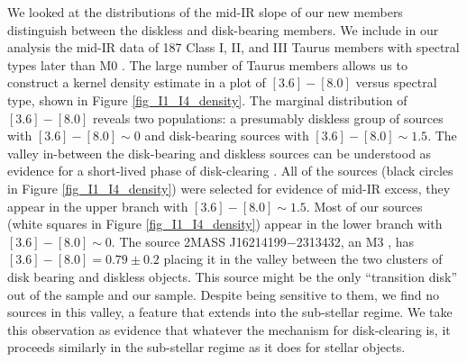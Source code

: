 We looked at the distributions of the mid-IR slope of our new members distinguish between the diskless and disk-bearing members.  We include in our analysis the mid-IR data of 187 Class I, II, and III Taurus members with spectral types later than M0 \citep{2010ApJS..186..111L}.  The large number of Taurus members allows us to construct a kernel density estimate in a plot of $[3.6]-[8.0]$ versus spectral type, shown in Figure \ref{fig_I1_I4_density}.  The marginal distribution of $[3.6]-[8.0]$ reveals two populations: a presumably diskless group of sources with $[3.6]-[8.0] \sim 0$ and disk-bearing sources with $[3.6]-[8.0] \sim 1.5$.  The valley in-between the disk-bearing and diskless sources can be understood as evidence for a short-lived phase of disk-clearing \citep{2009ApJS..181..321E}.  All of the \citet{allers06} sources (black circles in Figure \ref{fig_I1_I4_density}) were selected for evidence of mid-IR excess, they appear in the upper branch with $[3.6]-[8.0] \sim 1.5$.  Most of our sources (white squares in Figure \ref{fig_I1_I4_density}) appear in the lower branch with $[3.6]-[8.0] \sim 0$.  The source 2MASS J16214199$-$2313432, an M3 \citep{2011ASPC..448..633G}, has $[3.6]-[8.0]=0.79\pm0.2$ placing it in the valley between the two clusters of disk bearing and diskless objects.  This source might be the only ``transition disk'' out of the \citet{allers06} sample and our sample.  Despite being sensitive to them, we find no sources in this valley, a feature that extends into the sub-stellar regime.  We take this observation as evidence that whatever the mechanism for disk-clearing is, it proceeds similarly in the sub-stellar regime as it does for stellar objects. 

